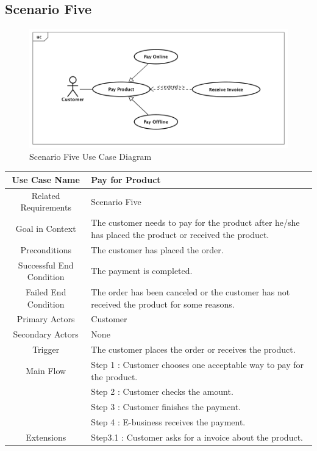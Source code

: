 \documentclass[12pt]{scrreprt}
\begin{document}
\subsection{Scenario Five}
\begin{figure}[H]
  \centering\includegraphics[width=5in]{DocumentRes/5UseCaseDiagram.png}
  \caption{Scenario Five Use Case Diagram}
\end{figure}

\begin{table}
  \centering
  \begin{tabular}{| c | p{11cm} |}
    \hline
    Use Case Name & Pay for Product\\
    \hline
    Related Requirements & Scenario Five\\
    \hline
    Goal in Context & The customer needs to pay for the product after he/she
    has placed the product or received the product.\\
    \hline
    Preconditions & The customer has placed the order.\\
    \hline
    Successful End Condition & The payment is completed.\\
    \hline
    Failed End Condition & The order has been canceled or the customer has not
    received the product for some reasons.\\
    \hline
    Primary Actors & Customer\\
    \hline
    Secondary Actors & None\\
    \hline
    Trigger & The customer places the order or receives the product.\\
    \hline
    Main Flow & Step 1 : Customer chooses one acceptable way to pay for the
    product.\\
    & Step 2 : Customer checks the amount.\\
    & Step 3 : Customer finishes the payment.\\
    & Step 4 : E-business receives the payment.\\
    \hline
    Extensions & Step3.1 : Customer asks for a invoice about the product.\\
    \hline
  \end{tabular}
\end{table}
\end{document}
